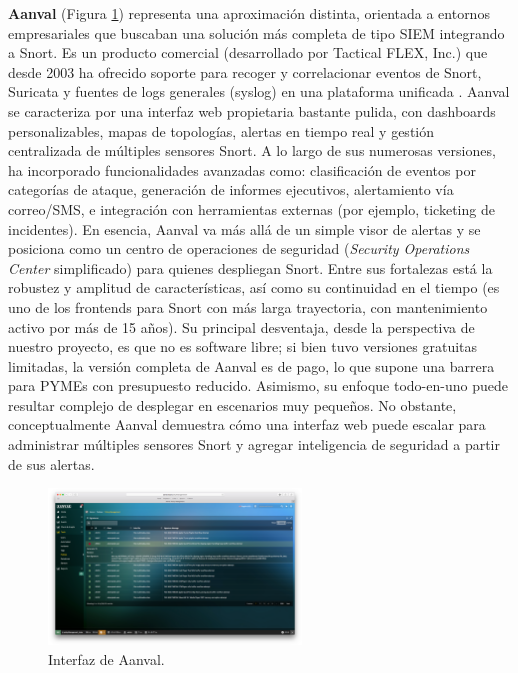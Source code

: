 \documentclass[11pt,a4paper,twoside]{report}
\begin{document}
\textbf{Aanval} (Figura \ref{fig:aanval}) representa una aproximación distinta, orientada a entornos empresariales que buscaban una solución más completa de tipo SIEM integrando a Snort. Es un producto comercial (desarrollado por Tactical FLEX, Inc.) que desde 2003 ha ofrecido soporte para recoger y correlacionar eventos de Snort, Suricata y fuentes de logs generales (syslog) en una plataforma unificada \cite{AanvalWiki}. Aanval se caracteriza por una interfaz web propietaria bastante pulida, con dashboards personalizables, mapas de topologías, alertas en tiempo real y gestión centralizada de múltiples sensores Snort. A lo largo de sus numerosas versiones, ha incorporado funcionalidades avanzadas como: clasificación de eventos por categorías de ataque, generación de informes ejecutivos, alertamiento vía correo/SMS, e integración con herramientas externas (por ejemplo, ticketing de incidentes). En esencia, Aanval va más allá de un simple visor de alertas y se posiciona como un centro de operaciones de seguridad (\textit{Security Operations Center} simplificado) para quienes despliegan Snort. Entre sus fortalezas está la robustez y amplitud de características, así como su continuidad en el tiempo (es uno de los frontends para Snort con más larga trayectoria, con mantenimiento activo por más de 15 años). Su principal desventaja, desde la perspectiva de nuestro proyecto, es que no es software libre; si bien tuvo versiones gratuitas limitadas, la versión completa de Aanval es de pago, lo que supone una barrera para PYMEs con presupuesto reducido. Asimismo, su enfoque todo-en-uno puede resultar complejo de desplegar en escenarios muy pequeños. No obstante, conceptualmente Aanval demuestra cómo una interfaz web puede escalar para administrar múltiples sensores Snort y agregar inteligencia de seguridad a partir de sus alertas.

\begin{figure}[H]
	\centering
	\includegraphics[width=0.6\textwidth]{documento/20.png}
	\caption{Interfaz de Aanval.}
	\label{fig:aanval}
\end{figure}
\end{document}

